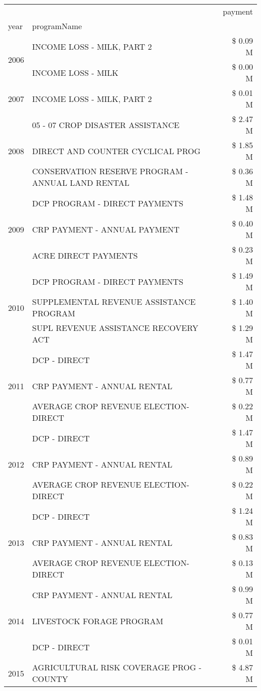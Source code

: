 \begin{tabular}{llr}
\toprule
 &  & payment \\
year & programName &  \\
\midrule
\multirow[t]{2}{*}{2006} & INCOME LOSS - MILK, PART 2 & \$ 0.09 M \\
 & INCOME LOSS - MILK & \$ 0.00 M \\
\cline{1-3}
2007 & INCOME LOSS - MILK, PART 2 & \$ 0.01 M \\
\cline{1-3}
\multirow[t]{3}{*}{2008} & 05 - 07 CROP DISASTER ASSISTANCE & \$ 2.47 M \\
 & DIRECT AND COUNTER CYCLICAL PROG & \$ 1.85 M \\
 & CONSERVATION RESERVE PROGRAM - ANNUAL LAND RENTAL & \$ 0.36 M \\
\cline{1-3}
\multirow[t]{3}{*}{2009} & DCP PROGRAM - DIRECT PAYMENTS & \$ 1.48 M \\
 & CRP PAYMENT - ANNUAL PAYMENT & \$ 0.40 M \\
 & ACRE DIRECT PAYMENTS & \$ 0.23 M \\
\cline{1-3}
\multirow[t]{3}{*}{2010} & DCP PROGRAM - DIRECT PAYMENTS & \$ 1.49 M \\
 & SUPPLEMENTAL REVENUE ASSISTANCE PROGRAM & \$ 1.40 M \\
 & SUPL REVENUE ASSISTANCE RECOVERY ACT & \$ 1.29 M \\
\cline{1-3}
\multirow[t]{3}{*}{2011} & DCP - DIRECT & \$ 1.47 M \\
 & CRP PAYMENT - ANNUAL RENTAL & \$ 0.77 M \\
 & AVERAGE CROP REVENUE ELECTION-DIRECT & \$ 0.22 M \\
\cline{1-3}
\multirow[t]{3}{*}{2012} & DCP - DIRECT & \$ 1.47 M \\
 & CRP PAYMENT - ANNUAL RENTAL & \$ 0.89 M \\
 & AVERAGE CROP REVENUE ELECTION-DIRECT & \$ 0.22 M \\
\cline{1-3}
\multirow[t]{3}{*}{2013} & DCP - DIRECT & \$ 1.24 M \\
 & CRP PAYMENT - ANNUAL RENTAL & \$ 0.83 M \\
 & AVERAGE CROP REVENUE ELECTION-DIRECT & \$ 0.13 M \\
\cline{1-3}
\multirow[t]{3}{*}{2014} & CRP PAYMENT - ANNUAL RENTAL & \$ 0.99 M \\
 & LIVESTOCK FORAGE PROGRAM & \$ 0.77 M \\
 & DCP - DIRECT & \$ 0.01 M \\
\cline{1-3}
\multirow[t]{3}{*}{2015} & AGRICULTURAL RISK COVERAGE PROG - COUNTY & \$ 4.87 M \\

\end{tabular}
